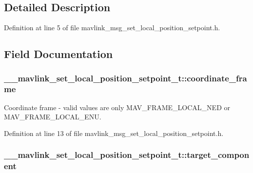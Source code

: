\subsection{Detailed Description}


Definition at line 5 of file mavlink\-\_\-msg\-\_\-set\-\_\-local\-\_\-position\-\_\-setpoint.\-h.



\subsection{Field Documentation}
\hypertarget{struct____mavlink__set__local__position__setpoint__t_af715de6975547e7e06421ea07b855898}{
\subsubsection[{coordinate\-\_\-frame}]{ \-\_\-\-\_\-mavlink\-\_\-set\-\_\-local\-\_\-position\-\_\-setpoint\-\_\-t\-::coordinate\-\_\-frame}}\label{struct____mavlink__set__local__position__setpoint__t_af715de6975547e7e06421ea07b855898}


Coordinate frame -\/ valid values are only M\-A\-V\-\_\-\-F\-R\-A\-M\-E\-\_\-\-L\-O\-C\-A\-L\-\_\-\-N\-E\-D or M\-A\-V\-\_\-\-F\-R\-A\-M\-E\-\_\-\-L\-O\-C\-A\-L\-\_\-\-E\-N\-U. 



Definition at line 13 of file mavlink\-\_\-msg\-\_\-set\-\_\-local\-\_\-position\-\_\-setpoint.\-h.

\hypertarget{struct____mavlink__set__local__position__setpoint__t_a21b41f125902f6e9695005b9df4c1430}{
\subsubsection[{target\-\_\-component}]{ \-\_\-\-\_\-mavlink\-\_\-set\-\_\-local\-\_\-position\-\_\-setpoint\-\_\-t\-::target\-\_\-component}}\label{struct____mavlink__set__local__position__setpoint__t_a21b41f125902f6e9695005b9df4c1430}


